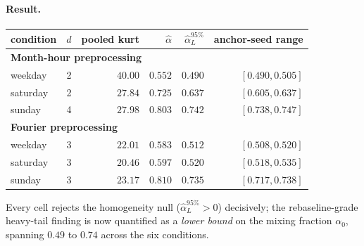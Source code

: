 \documentclass[11pt]{article}
\begin{document}
\paragraph{Result.}
\begin{center}\small
\begin{tabular}{l r r r r r}
\toprule
condition & \(d\) & pooled kurt & \(\hat\alpha\) & \(\hat\alpha_L^{95\%}\) & anchor-seed range \\
\midrule
\multicolumn{6}{l}{\textbf{Month-hour preprocessing}} \\
weekday  & 2 & \(40.00\) & \(0.552\) & \(0.490\) & \([0.490, 0.505]\) \\
saturday & 2 & \(27.84\) & \(0.725\) & \(0.637\) & \([0.605, 0.637]\) \\
sunday   & 4 & \(27.98\) & \(0.803\) & \(0.742\) & \([0.738, 0.747]\) \\
\multicolumn{6}{l}{\textbf{Fourier preprocessing}} \\
weekday  & 3 & \(22.01\) & \(0.583\) & \(0.512\) & \([0.508, 0.520]\) \\
saturday & 3 & \(20.46\) & \(0.597\) & \(0.520\) & \([0.518, 0.535]\) \\
sunday   & 3 & \(23.17\) & \(0.810\) & \(0.735\) & \([0.717, 0.738]\) \\
\bottomrule
\end{tabular}
\end{center}
Every cell rejects the homogeneity null
(\(\hat\alpha_L^{95\%} > 0\)) decisively; the rebaseline-grade
heavy-tail finding is now quantified as a \emph{lower bound} on the
mixing fraction \(\alpha_0\), spanning \(0.49\) to \(0.74\) across
the six conditions.
\end{document}
